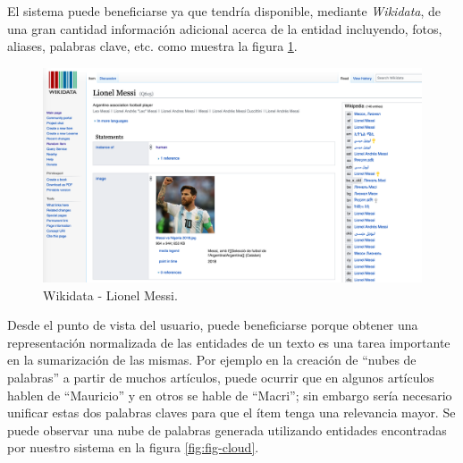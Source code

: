 \documentclass[12pt,a4paper,]{scrartcl}
\begin{document}
El sistema puede beneficiarse ya que tendría disponible, mediante \emph{Wikidata}, de una gran cantidad información adicional acerca de la entidad incluyendo, fotos, aliases, palabras clave, etc. como muestra la figura \ref{fig:fig-messi}.

\begin{figure}[H]

{\centering \includegraphics{assets/wikidata_messi.pdf} 

}

\caption{Wikidata - Lionel Messi.}\label{fig:fig-messi}
\end{figure}

Desde el punto de vista del usuario, puede beneficiarse porque obtener una representación normalizada de las entidades de un texto es una tarea importante en la sumarización de las mismas. Por ejemplo en la creación de \enquote{nubes de palabras} a partir de muchos artículos, puede ocurrir que en algunos artículos hablen de \enquote{Mauricio} y en otros se hable de \enquote{Macri}; sin embargo sería necesario unificar estas dos palabras claves para que el ítem tenga una relevancia mayor. Se puede observar una nube de palabras generada utilizando entidades encontradas por nuestro sistema en la figura \ref{fig:fig-cloud}.
\end{document}
